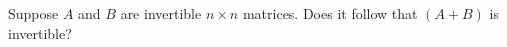 \documentclass{ximera}
\begin{document}


\begin{problem}\label{prob:sumofinvertible} Suppose $A$ and $B$ are invertible $n\times n$ matrices.  Does it follow that $(A+B)$ is invertible?
\end{problem}
\end{document}
